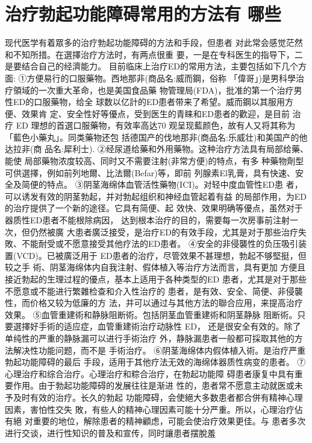 \documentclass[12pt,UTF8]{ctexbook}
\begin{document}
\section{治疗勃起功能障碍常用的方法有
哪些}
现代医学有着眾多的治疗勃起功能障碍的方法和手段，但患者
对此常会感觉茫然和不知所措。在選擇治疗方法时，有两点很重
要，一是在专科医生的指导下，二是要结合自己的经濟能力。
目前临床上治疗ED的常用方法，主要包括如下几个方面:
①方便易行的口服藥物。西地那非(商品名:威而鋼，俗称
「偉哥」)是男科學治疗領域的一次重大革命，也是美国食品藥
物管理局(FDA)，批准的第一个治疗男性ED的口服藥物，给全
球数以亿計的ED患者带来了希望。威而鋼以其服用方便、效果肯
定、安全性好等優点，受到医生的青睐和ED患者的歡迎，是目前
治疗 ED 理想的首選口服藥物，有效率高达70%
观呈现藍颜色，故有人又将其称为「藍色小藥丸」。同类藥物还包
括德国产的伐地那非(商品名:乐威壮)和美国产的他达拉非(商
品名:犀利士).
②经尿道给藥和外用藥物。这种治疗方法具有局部给藥、能使
局部藥物浓度较高、同时又不需要注射(非常方便)的特点，有多
种藥物劑型可供選擇，例如前列地爾、比法爾(Befar)等，即前
列腺素El乳膏，具有快速、安全及简便的特点。
③阴茎海绵体血管活性藥物(ICI)。对轻中度血管性ED患
者，可以诱发有效的阴茎勃起，并对勃起组织和神经血管起着有益
的局部作用，为ED的治疗提供了一个新的途径。它具有简便、起
效快、效果明确等優点，虽然对于器质性ED患者不能根除病因，
达到根本治疗的目的，需要每一次房事前注射一次，但仍然被廣
大患者廣泛接受，是治疗ED的有效手段，尤其是对于那些治疗失
敗、不能耐受或不愿意接受其他疗法的ED患者。
④安全的非侵襲性的负压吸引装置(VCD)。已被廣泛用于
ED患者的治疗，尽管效果不甚理想，勃起不够堅挺，但较之手
術、阴茎海绵体内自我注射、假体植入等治疗方法而言，具有更加
方便且接近勃起的生理过程的優点，基本上适用于各种类型的ED
患者，尤其是对于那些不愿意或不能进行繁雜检查和介入性治疗的
患者，是有效、安全、简便、非侵襲性，而价格又较为低廉的方
法，并可以通过与其他方法的聯合应用，来提高治疗效果。
⑤血管重建術和静脉阻断術。包括阴茎血管重建術和阴茎静脉
阻断術。只要選擇好手術的适应症，血管重建術治疗动脉性 ED，
还是很安全有效的。除了单纯性的严重的静脉漏可以进行手術治疗
外，静脉漏患者一般都可採取其他的方法解决性功能问题，而不是
手術治疗。
⑥阴茎海绵体内假体植入術。是治疗严重勃起功能障碍的最后
手段，适用于其他疗法无效的海绵体器质性病变的患者。
⑦心理治疗和综合治疗。心理治疗和粽合治疗，在勃起功能障
碍患者康复中具有重要作用。由于勃起功能障碍的发展往往是渐进
性的，患者常不愿意主动就医或未予及时有效的治疗。长久的勃起
功能障碍，会使絕大多数患者都合併有精神心理因素，害怕性交失
敗，有些人的精神心理因素可能十分严重。所以，心理治疗佔有絕
对重要的地位，解除患者的精神顧虑，可能会使治疗效果更佳。与
患者多次进行交谈，进行性知识的普及和宣传，同时讓患者摆脫羞
\end{document}
